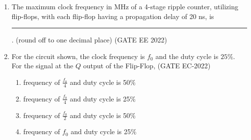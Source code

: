 \begin{enumerate}
\item The maximum clock frequency in MHz of a 4-stage ripple counter, utilizing flip-flops, with each flip-flop having a propagation delay of 20 ns, is \rule{1cm}{0.10mm}. (round off to one decimal place)
\label{gate-ee-2022-29}
\hfill (GATE EE 2022)
\item For the circuit shown, the clock frequency is $f_0$ and the duty cycle is $25\%$. For the signal at the $Q$ output of the Flip-Flop,
\label{prob:2022/gate/ec/43}
\hfill (GATE EC-2022)


\begin{enumerate}
  \item frequency of $\frac{f_0}{4}$ and duty cycle is 50$\%$
  \item frequency of $\frac{f_0}{4}$ and duty cycle is 25$\%$
  \item frequency of $\frac{f_0}{2}$ and duty cycle is 50$\%$
  \item frequency of $f_0$ and duty cycle is 25$\%$ \\
\end{enumerate}
\end{enumerate}
